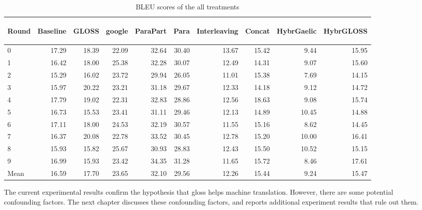 \documentclass[final]{ua-thesis}
\numberwithin{equation}{section}
\begin{document}
\begin{table}[ht]
\centering
\begin{tabular}{lrrrrrrrrr}
  \hline
\begin{sideways} Round \end{sideways} & \begin{sideways} Baseline \end{sideways} & \begin{sideways} GLOSS \end{sideways} & \begin{sideways} google \end{sideways} & \begin{sideways} ParaPart \end{sideways} & \begin{sideways} Para \end{sideways} & \begin{sideways} Interleaving \end{sideways} & \begin{sideways} Concat \end{sideways} & \begin{sideways} HybrGaelic \end{sideways} & \begin{sideways} HybrGLOSS \end{sideways} \\ 
  \hline
0 & 17.29 & 18.39 & 22.09 & 32.64 & 30.40 & 13.67 & 15.42 & 9.44 & 15.95 \\ 
  1 & 16.42 & 18.00 & 25.38 & 32.28 & 30.07 & 12.49 & 14.31 & 9.07 & 15.60 \\ 
  2 & 15.29 & 16.02 & 23.72 & 29.94 & 26.05 & 11.01 & 15.38 & 7.69 & 14.15 \\ 
  3 & 15.97 & 20.22 & 23.21 & 31.18 & 29.67 & 12.33 & 14.18 & 9.12 & 14.72 \\ 
  4 & 17.79 & 19.02 & 22.31 & 32.83 & 28.86 & 12.56 & 18.63 & 9.08 & 15.74 \\ 
  5 & 16.73 & 15.53 & 23.41 & 31.11 & 29.46 & 12.13 & 14.89 & 10.45 & 14.88 \\ 
  6 & 17.11 & 18.00 & 24.53 & 32.19 & 30.57 & 11.55 & 15.16 & 8.62 & 14.45 \\ 
  7 & 16.37 & 20.08 & 22.78 & 33.52 & 30.45 & 12.78 & 15.20 & 10.00 & 16.41 \\ 
  8 & 15.93 & 15.82 & 25.67 & 30.93 & 28.83 & 12.43 & 15.50 & 10.52 & 15.15 \\ 
  9 & 16.99 & 15.93 & 23.42 & 34.35 & 31.28 & 11.65 & 15.72 & 8.46 & 17.61 \\ 
   \hline
Mean & 16.59 & 17.70 & 23.65 & 32.10 & 29.56 & 12.26 & 15.44 & 9.24 & 15.47 \\ 
   \hline
\end{tabular}
\caption{BLEU scores of the all treatments} 
\label{table:complete_table}
\end{table}
The current experimental results confirm the hypothesis that gloss helps machine translation. However, there are some potential confounding factors. The next chapter discusses these confounding factors, and reports additional experiment results that rule out them.
\end{document}
